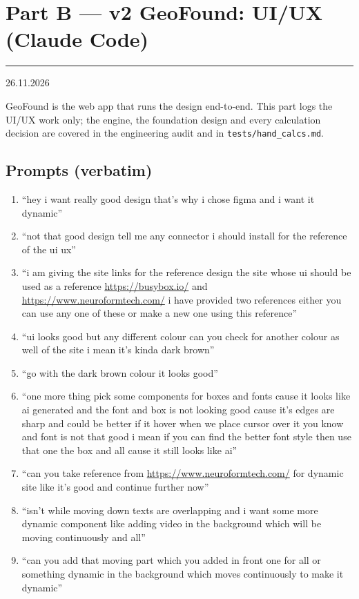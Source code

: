 \documentclass[11pt,a4paper]{article}
\newcommand{\stamp}[1]{{\small\bfseries\color{black!70}\textcolor{accent}{\rule[-2pt]{2pt}{10pt}}\hspace{6pt}#1}\par}
\newcommand{\code}[1]{\texttt{\small #1}}
\begin{document}
\section{Part B --- v2 GeoFound: UI/UX (Claude Code)}
\stamp{26.11.2026}
GeoFound is the web app that runs the design end-to-end. This part logs the UI/UX work only; the engine, the
foundation design and every calculation decision are covered in the engineering audit and in
\code{tests/hand\_calcs.md}.

\subsection{Prompts (verbatim)}
\begin{enumerate}[label=\arabic*.]
\item ``hey i want really good design that's why i chose figma and i want it dynamic''
\item ``not that good design tell me any connector i should install for the reference of the ui ux''
\item ``i am giving the site links for the reference design the site whose ui should be used as a reference
  \url{https://busybox.io/} and \url{https://www.neuroformtech.com/} i have provided two references either you can use
  any one of these or make a new one using this reference''
\item ``ui looks good but any different colour can you check for another colour as well of the site i mean it's kinda
  dark brown''
\item ``go with the dark brown colour it looks good''
\item ``one more thing pick some components for boxes and fonts cause it looks like ai generated and the font and box
  is not looking good cause it's edges are sharp and could be better if it hover when we place cursor over it you know
  and font is not that good i mean if you can find the better font style then use that one the box and all cause it
  still looks like ai''
\item ``can you take reference from \url{https://www.neuroformtech.com/} for dynamic site like it's good and continue
  further now''
\item ``isn't while moving down texts are overlapping and i want some more dynamic component like adding video in the
  background which will be moving continuously and all''
\item ``can you add that moving part which you added in front one for all or something dynamic in the background which
  moves continuously to make it dynamic''

\end{enumerate}
\end{document}
